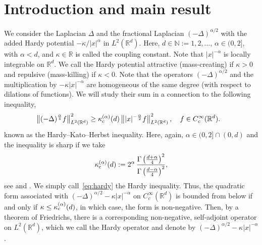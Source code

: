 \documentclass[12pt,reqno]{amsart}
\theoremstyle{definition}
\theoremstyle{remark}
\numberwithin{equation}{section}
\newcommand{\1}{\mathbbm{1}}
\newcommand{\N}{\mathbb{N}}
\newcommand{\R}{\mathbb{R}}
\def\Rd{{\mathbb{R}^d}}
\begin{document}
\section{Introduction and main result}
\label{s:introduction}

We consider the Laplacian $\Delta$ and the fractional Laplacian $(-\Delta)^{\alpha/2}$ with the added Hardy potential $-\kappa/|x|^\alpha$ in $L^2(\R^d)$. Here, $d \in \N := {1,2,\ldots}$, $\alpha \in (0, 2]$, with $\alpha < d$, and $\kappa \in \R$ is called the coupling constant. Note that $|x|^{-\alpha}$ is locally integrable on $\Rd$.
We call the Hardy potential attractive (mass-creating) if $\kappa>0$ and repulsive (mass-killing) if $\kappa<0$. Note that the operators $(-\Delta)^{\alpha/2}$ and the multiplication by $-\kappa|x|^{-\alpha}$ are homogeneous of the same degree (with respect to dilations of functions). 
We will study their sum 
in a connection to the following inequality,
\begin{align}
  \label{eq:hardy}
  \begin{split}
    & \left\| (-\Delta)^{\frac\alpha4} f \right\|_{L^2(\R^d)}^2
    \geq \kappa_{\rm c}^{(\alpha)}(d) \left\| |x|^{-\frac\alpha2} f \right\|_{L^2(\R^d)}^2, \quad f\in C_c^\infty(\R^d).
  \end{split}
\end{align}
known as the Hardy--Kato--Herbst inequality.
Here, again, $\alpha\in(0,2]\cap(0,d)$ and the inequality is sharp if we take
\begin{align}
  \kappa_{\rm c}^{(\alpha)}(d) := 2^\alpha\, \frac{\Gamma\left(\frac{d+\alpha}{4}\right)^2}{\Gamma\left(\frac{d-\alpha}{4}\right)^2},
\end{align}
see \cite{Hardy1919,Hardy1920,Kato1966,Herbst1977} and
\cite{Kovalenkoetal1981,Yafaev1999,Franketal2008H,FrankSeiringer2008}.
We simply call~\eqref{eq:hardy} the Hardy inequality. 
Thus, the quadratic form associated with $(-\Delta)^{\alpha/2} - \kappa |x|^{-\alpha}$ on $C_c^\infty(\R^d)$ is bounded from below if and only if $\kappa \leq \kappa_{\rm c}^{(\alpha)}(d)$, in which case, the form is non-negative. Then, by a theorem of Friedrichs, there is a corresponding non-negative, self-adjoint operator on $L^2(\Rd)$, which we call the Hardy operator and denote by $(-\Delta)^{\alpha/2} - \kappa |x|^{-\alpha}$.
\end{document}
